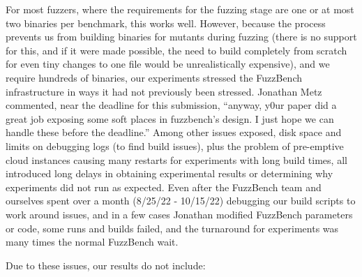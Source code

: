For most fuzzers, where the requirements for the fuzzing stage are one or at most two binaries per benchmark, this works well.  However, because the process prevents us from building binaries for mutants during fuzzing (there is no support for this, and if it were made possible, the need to build completely from scratch for even tiny changes to one file would be unrealistically expensive), and we require hundreds of binaries, our experiments stressed the FuzzBench infrastructure in ways it had not previously been stressed.  Jonathan Metz commented, near the deadline for this submission, ``anyway, y0ur paper did a great job exposing some soft places in fuzzbench's design. I just hope we can handle these before the deadline.''  Among other issues exposed, disk space and limits on debugging logs (to find build issues), plus the problem of pre-emptive cloud instances causing many restarts for experiments with long build times, all introduced long delays in obtaining experimental results or determining why experiments did not run as expected.  Even after the FuzzBench team and ourselves spent over a month (8/25/22 - 10/15/22) debugging our build scripts to work around issues, and in a few cases Jonathan modified FuzzBench parameters or code, some runs and builds failed, and the turnaround for experiments was many times the normal FuzzBench wait.

Due to these issues, our results do not include:

